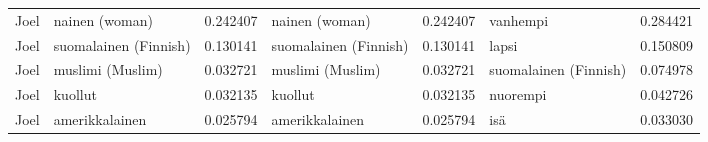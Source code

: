 \begin{longtable}{llrlrlr}
  Joel &        nainen (woman) &                         0.242407 &         nainen (woman) &                              0.242407 &              vanhempi &                        0.284421 \\
  Joel & suomalainen (Finnish) &                         0.130141 &  suomalainen (Finnish) &                              0.130141 &                 lapsi &                        0.150809 \\
  Joel &      muslimi (Muslim) &                         0.032721 &       muslimi (Muslim) &                              0.032721 & suomalainen (Finnish) &                        0.074978 \\
  Joel &               kuollut &                         0.032135 &                kuollut &                              0.032135 &              nuorempi &                        0.042726 \\
  Joel &        amerikkalainen &                         0.025794 &         amerikkalainen &                              0.025794 &                   isä &                        0.033030 \\
\end{longtable}
